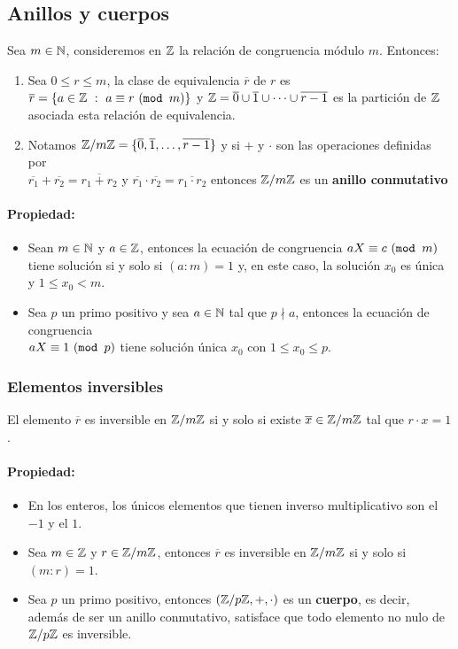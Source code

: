 \subsection{Anillos y cuerpos}
Sea $m\in\mathbb{N}$, consideremos en $\mathbb{Z}$ la relación de congruencia módulo $m$. Entonces:
\begin{enumerate}
    \item Sea $0\leq r\leq m$, la clase de equivalencia $\overline{r}$ de $r$ es $\overline{r} = \{a\in\mathbb{Z}~:~a \equiv r ~(\texttt{mod } m)\}$ y $\mathbb{Z} = \overline{0}\cup\overline{1}\cup\dots\cup\overline{r-1}$ es la partición de $\mathbb{Z}$ asociada esta relación de equivalencia.
    \item Notamos $\mathbb{Z}/m\mathbb{Z} = \{ \overline{0},\overline{1},\dots,\overline{r-1}\}$ y si $+$ y $\cdot$ son las operaciones definidas por \\ $\overline{r_1}+\overline{r_2} = \overline{r_1 + r_2}$ y $\overline{r_1}\cdot\overline{r_2} = \overline{r_1 \cdot r_2}$ entonces $\mathbb{Z}/m\mathbb{Z}$ es un \textbf{anillo conmutativo}
\end{enumerate}

\paragraph{Propiedad:} 
\begin{itemize}
\item Sean $m\in\mathbb{N}$ y $a\in\mathbb{Z}$, entonces la ecuación de congruencia $aX \equiv c ~(\texttt{mod } m)$ tiene solución si y solo si $(a:m)=1$ y, en este caso, la solución $x_0$ es única y $1\leq x_0<m$.
\item Sea $p$ un primo positivo y sea $a\in\mathbb{N}$ tal que $p\nmid a$, entonces la ecuación de congruencia \\ $aX \equiv 1 ~(\texttt{mod } p)$ tiene solución única $x_0$ con $1\leq x_0\leq p$.
\end{itemize}

\subsubsection{Elementos inversibles}
El elemento $\overline{r}$ es inversible en $\mathbb{Z}/m\mathbb{Z}$ si
y solo si existe $\overline{x} \in \mathbb{Z}/m\mathbb{Z}$ tal que $r\cdot x = 1$ .

\paragraph{Propiedad:} 
\begin{itemize}
\item En los enteros, los únicos elementos que tienen inverso multiplicativo son el $-1$ y el $1$.
\item Sea $m\in\mathbb{Z}$ y $r\in\mathbb{Z}/m\mathbb{Z}$, entonces $\overline{r}$ es inversible en $\mathbb{Z}/m\mathbb{Z}$ si y solo si $(m:r)=1$.
\item Sea $p$ un primo positivo, entonces $(\mathbb{Z}/p\mathbb{Z}, +,\cdot)$ es un \textbf{cuerpo}, es decir, además de ser un anillo conmutativo, satisface que todo elemento no nulo de $\mathbb{Z}/p\mathbb{Z}$ es inversible.
\end{itemize}
